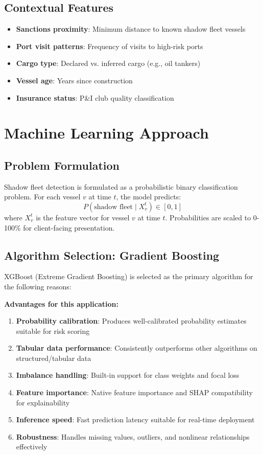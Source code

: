 \subsection{Contextual Features}
\begin{itemize}
    \item \textbf{Sanctions proximity}: Minimum distance to known shadow fleet vessels
    \item \textbf{Port visit patterns}: Frequency of visits to high-risk ports
    \item \textbf{Cargo type}: Declared vs. inferred cargo (e.g., oil tankers)
    \item \textbf{Vessel age}: Years since construction
    \item \textbf{Insurance status}: P\&I club quality classification
\end{itemize}

\section{Machine Learning Approach}

\subsection{Problem Formulation}
Shadow fleet detection is formulated as a probabilistic binary classification problem. For each vessel $v$ at time $t$, the model predicts:
\begin{equation}
P(\text{shadow fleet} \mid X_v^t) \in [0, 1]
\end{equation}
where $X_v^t$ is the feature vector for vessel $v$ at time $t$. Probabilities are scaled to 0-100\% for client-facing presentation.

\subsection{Algorithm Selection: Gradient Boosting}
XGBoost (Extreme Gradient Boosting) is selected as the primary algorithm for the following reasons:

\textbf{Advantages for this application:}
\begin{enumerate}
    \item \textbf{Probability calibration}: Produces well-calibrated probability estimates suitable for risk scoring
    \item \textbf{Tabular data performance}: Consistently outperforms other algorithms on structured/tabular data
    \item \textbf{Imbalance handling}: Built-in support for class weights and focal loss
    \item \textbf{Feature importance}: Native feature importance and SHAP compatibility for explainability
    \item \textbf{Inference speed}: Fast prediction latency suitable for real-time deployment
    \item \textbf{Robustness}: Handles missing values, outliers, and nonlinear relationships effectively
\end{enumerate}

